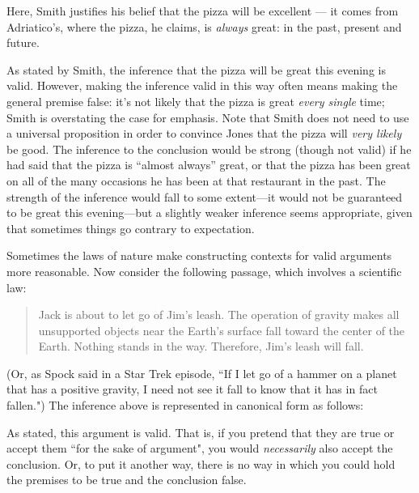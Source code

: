 Here, Smith justifies his belief that the pizza will be excellent --- it comes from Adriatico's, where the pizza, he claims, is \textit{always }great: in the past, present and future.

As stated by Smith, the inference that the pizza will be great this evening is valid. However, making the inference valid in this way often means making the general premise false: it's not likely that the pizza is great \textit{every single }time; Smith is overstating the case for emphasis. Note that Smith does not need to use a universal proposition in order to convince Jones that the pizza will \textit{very likely} be good. The inference to the conclusion would be strong (though not valid) if he had said that the pizza is ``almost always'' great, or that the pizza has been great on all of the many occasions he has been at that restaurant in the past. The strength of the inference would fall to some extent---it would not be guaranteed to be great this evening---but a slightly weaker inference seems appropriate, given that sometimes things go contrary to expectation.

Sometimes the laws of nature make constructing contexts for valid arguments more reasonable. Now consider the following passage, which involves a scientific law:

\begin{quotation}\noindent Jack is about to let go of Jim's leash. The operation of gravity makes all unsupported objects near the Earth's surface fall toward the center of the Earth. Nothing stands in the way. Therefore, Jim's leash will fall. \end{quotation}

(Or, as Spock said in a Star Trek episode, ``If I let go of a hammer on a planet that has a positive gravity, I need not see it fall to know that it has in fact fallen.") The inference above is represented in canonical form as follows:

\begin{kormanize}
\end{kormanize}

As stated, this argument is valid. That is, if you pretend that they are true or accept them ``for the sake of argument", you would \textit{necessarily} also accept the conclusion. Or, to put it another way, there is no way in which you could hold the premises to be true and the conclusion false.

